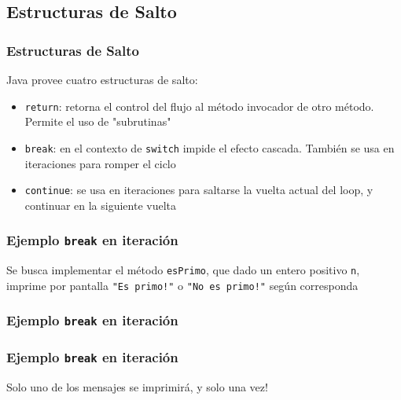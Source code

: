 \documentclass{beamer}
\newcommand{\code}[1]{\texttt{#1}}
\newcommand{\codet}[1]{\texttt{#1}}
\begin{document}
\subsection{Estructuras de Salto}

\begin{frame}
  \frametitle{Estructuras de Salto}
  
  Java provee cuatro estructuras de salto:
  \begin{itemize}

  \item\code{return}: retorna el control del flujo al método
    invocador de otro método. Permite el uso de "subrutinas"
    
  \item \code{break}: en el contexto de \code{switch} impide el
    efecto cascada. También se usa en iteraciones para
    romper el ciclo
    
  \item \code{continue}: se usa en iteraciones para saltarse la
    vuelta actual del loop, y continuar en la siguiente vuelta

  \end{itemize}
\end{frame}

\begin{frame}
  \frametitle{Ejemplo \code{break} en iteración}

  \begin{block}{}
    Se busca implementar el método \code{esPrimo}, que dado un entero
    positivo \code{n}, imprime por pantalla \code{"Es primo!"} o
    \code{"No es primo!"} según corresponda
  \end{block}
  
\end{frame}


\begin{frame}[fragile]
  \frametitle{Ejemplo \codet{break} en iteración}

\end{frame}

\begin{frame}[fragile]
  \frametitle{Ejemplo \codet{break} en iteración}

  Solo uno de los mensajes se imprimirá, y solo una vez!
\end{frame}
\end{document}
